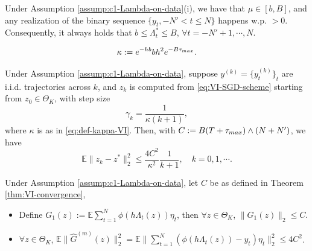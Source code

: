 \documentclass[10pt,a4paper]{amsart}
\newcommand{\E}{\mathbb{E}}
\begin{document}
\begin{lemma}\label{lemma:c1-Lambda-on-data-implication}
Under Assumption \ref{assump:c1-Lambda-on-data}(i), 
we have that $\mu \in [b,B]$, and any realization of the binary sequence $\{y_t, -N' <  t \le N\}$ happens w.p. $> 0$. Consequently, it always holds that $b \le \Lambda_t^*  \le B$, $\forall t= -N'+1, \cdots, N$. 
\end{lemma}

\begin{equation}\label{eq:def-kappa-VI}
\kappa :=  e^{-hb} b h^2  e^{- B \tau_{\rm max}}.
\end{equation}

\begin{theorem}\label{thm:VI-convergence}
Under Assumption \ref{assump:c1-Lambda-on-data}, 
suppose $y^{(k)} = \{ y_t^{(k)} \}_t$ are i.i.d. trajectories across $k$,
and $z_k$ is computed from \eqref{eq:VI-SGD-scheme} starting from $z_0 \in \Theta_K$,
with step size
\[
\gamma_k = \frac{1}{\kappa (k+1)},
\]
where $\kappa$ is as in \eqref{eq:def-kappa-VI}.
Then, with $C:= B(T+ \tau_{\rm max} )  \wedge (N + N')$, 
we have
\[
\E \|z_k - z^* \|_2^2 \le \frac{4 C^2 }{\kappa^2} \frac{1}{k+1}, \quad k = 0, 1,  \cdots.
\]
\end{theorem}

\begin{lemma}\label{lemma:boundedness-VI}
Under Assumption \ref{assump:c1-Lambda-on-data}, 
let  $C$ be as defined in Theorem \ref{thm:VI-convergence},
\begin{itemize}
\item[(i)] Define $G_1(z) :=  \E \sum_{t=1}^N \phi( h \Lambda_t(z)) \eta_t $, 
then $\forall z \in \Theta_K$, $\| G_1(z) \|_2 \le C$.
\item[(ii)] $\forall z \in \Theta_K$, 
$\E \| \hat G^{(m)}( z )  \|_2^2 =  \E \| \sum_{t=1}^N \left(\phi( h \Lambda_t (z)) - y_t \right) \eta_t \|_2^2 
\le 4 C^2$.
\end{itemize}
\end{lemma}
\end{document}
